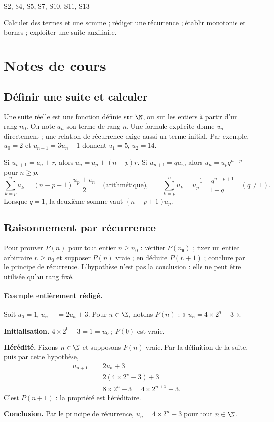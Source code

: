 \setcounter{chapter}{0}\label{ch:1}

{\small\sffamily\color{mxmint}S2, S4, S5, S7, S10, S11, S13\par}

\begin{keypoint}[Objectifs]Calculer des termes et une somme ; rédiger une récurrence ; établir monotonie et bornes ; exploiter une suite auxiliaire.\end{keypoint}

\section{Notes de cours}
\subsection{Définir une suite et calculer}
Une suite réelle est une fonction définie sur $\N$, ou sur les entiers à partir d'un rang $n_0$. On note $u_n$ son terme de rang $n$. Une formule explicite donne $u_n$ directement ; une relation de récurrence exige aussi un terme initial. Par exemple, $u_0=2$ et $u_{n+1}=3u_n-1$ donnent $u_1=5$, $u_2=14$.
\begin{keypoint}
Si $u_{n+1}=u_n+r$, alors $u_n=u_p+(n-p)r$. Si $u_{n+1}=qu_n$, alors $u_n=u_pq^{n-p}$ pour $n\ge p$.
\[\sum_{k=p}^n u_k=(n-p+1)\frac{u_p+u_n}{2}\quad\text{(arithmétique)},\qquad
\sum_{k=p}^n u_k=u_p\frac{1-q^{n-p+1}}{1-q}\quad(q\ne1).\]
Lorsque $q=1$, la deuxième somme vaut $(n-p+1)u_p$.
\end{keypoint}
\subsection{Raisonnement par récurrence}
Pour prouver $P(n)$ pour tout entier $n\ge n_0$ : vérifier $P(n_0)$ ; fixer un entier arbitraire $n\ge n_0$ et supposer $P(n)$ vraie ; en déduire $P(n+1)$ ; conclure par le principe de récurrence. L'hypothèse n'est pas la conclusion : elle ne peut être utilisée qu'au rang fixé.
\paragraph{Exemple entièrement rédigé.} Soit $u_0=1$, $u_{n+1}=2u_n+3$. Pour $n\in\N$, notons $P(n)$ : « $u_n=4\times2^n-3$ ».
\par\smallskip\textbf{Initialisation.} $4\times2^0-3=1=u_0$ ; $P(0)$ est vraie.
\par\smallskip\textbf{Hérédité.} Fixons $n\in\N$ et supposons $P(n)$ vraie. Par la définition de la suite, puis par cette hypothèse,
\[\begin{aligned}u_{n+1}&=2u_n+3\\&=2(4\times2^n-3)+3\\&=8\times2^n-3=4\times2^{n+1}-3.\end{aligned}\]
C'est $P(n+1)$ : la propriété est héréditaire.
\par\smallskip\textbf{Conclusion.} Par le principe de récurrence, $u_n=4\times2^n-3$ pour tout $n\in\N$.
